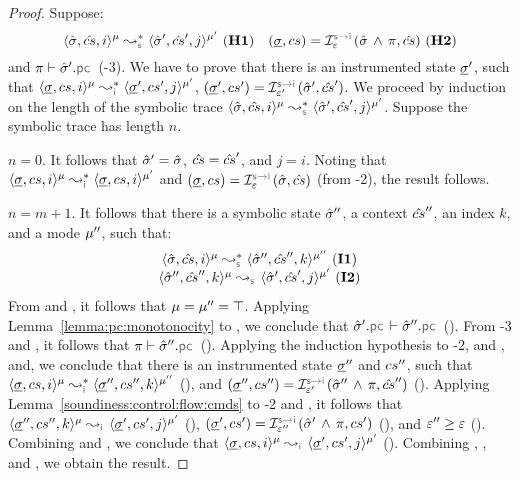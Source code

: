 \begin{proof}

Suppose:
$$
\transabssemrule{\sstate, \scs, i}{\sstate', \scs', j}{\mode}{\mode'}{\symbolic} \text{ (\hyp{1})}
\quad 
 (\istate, \cs) = \interpret{\symbinst}{\senv}(\sstate \, \wedge \, \pc, \scs) \text{ (\hyp{2})}
 $$
and
$\pc \vdash \sstate'.\pcsel$ (\hyp{3}). 
We have to prove that there is an instrumented state $\underline{\sigma}'$,
such that $\transabssemrule{\istate, \cs, i}{\istate', \cs', j}{\mode}{\mode'}{\instrumented}$, 
$(\istate', \cs') = \interpret{\symbinst}{\senv'}(\sstate', \scs')$.
We proceed by induction on the length of the symbolic trace 
 $\transabssemrule{\sstate, \scs, i}{\sstate', \scs', j}{\mode}{\mode'}{\symbolic}$. 
Suppose the symbolic trace has length $n$. 
\vspace{6pt}

\noindent {} $n = 0$. It follows that $\hat{\sigma}' = \hat{\sigma}$, 
$\hat{cs} = \hat{cs}'$, and $j = i$. Noting that 
$\transabssemrule{\istate, \cs, i}{\istate, \cs, i}{\mode}{\mode'}{\instrumented}$
and 
$(\istate, \cs) = \interpret{\symbinst}{\senv}(\sstate, \scs)$ (from \hyp{2}), 
the result follows. 
\vspace{6pt}


\noindent {} $n = m + 1$. It follows that there is a symbolic state 
$\hat{\sigma}''$, a context $\hat{cs}''$, an index $k$, and a mode $\mu''$, such that: 
$$
\begin{array}{c}
\transabssemrule{\sstate, \scs, i}{\sstate'', \scs'', k}{\mode}{\mode''}{\symbolic} \text{ (\ieq{1})} \\ 
\abssemrule{\sstate'', \scs'', k}{\sstate', \scs', j}{\mode}{\mode'}{\symbolic} \text{ (\ieq{2})}
\end{array}
$$
From  and , it follows that $\mu = \mu'' = \top$. 
Applying Lemma~\ref{lemma:pc:monotonocity} to , we conclude that $\sstate'.\pcsel \vdash \sstate''.\pcsel$ (). 
From \hyp{3} and , it follows that $\pc \vdash \sstate''.\pcsel$ (). 
Applying the induction hypothesis to \hyp{2},  and , and, we conclude that 
there is an instrumented state $\underline{\sigma}''$ and $cs''$, such that
$\transabssemrule{\istate, \cs, i}{\istate'', \cs'', k}{\mode}{\mode''}{\instrumented}$ (), and
$(\istate'', \cs'') = \interpret{\symbinst}{\senv'}(\sstate'' \, \wedge \, \pc, \scs'')$ ().
Applying Lemma~\ref{soundiness:control:flow:cmds} to \hyp{2} and ,
it follows that  
$\abssemrule{\istate'', \cs'', k}{\istate', \cs', j}{\mode}{\mode'}{\instrumented}$ (), 
$(\istate', \cs') = \interpret{\symbinst}{\senv''}(\sstate' \, \wedge \, \pc, \cs')$ (), and 
$\varepsilon'' \geq  \varepsilon$ (). 
Combining  and , we conclude that 
$\abssemrule{\istate, \cs, i}{\istate', \cs', j}{\mode}{\mode'}{\instrumented}$ (). 
Combining , , and , we obtain the result. 
\end{proof}

